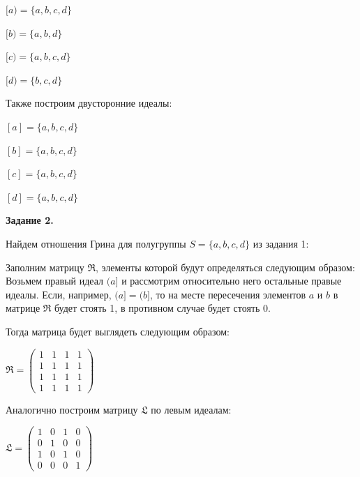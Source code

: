\documentclass[bachelor, och, labwork]{shiza}
\begin{document}
\begin{enumerate}
      \begin{center}
      
        $[a) = \{a, b, c, d\}$

        $[b) = \{a, b, d\}$

        $[c) = \{a, b, c, d\}$

        $[d) = \{b, c, d\}$
      \end{center}

      Также построим двусторонние идеалы:

      \begin{center}
      
        $[a] = \{a, b, c, d\}$

        $[b] = \{a, b, c, d\}$

        $[c] = \{a, b, c, d\}$

        $[d] = \{a, b, c, d\}$
        
      \end{center}


    \end{enumerate}
    
    
    \textbf{Задание 2.}
    
    Найдем отношения Грина для полугруппы $S = \{a, b, c, d\}$ из задания 1:

    Заполним матрицу $\mathfrak{R}$, элементы которой будут определяться следующим образом: Возьмем правый идеал $(a]$ и рассмотрим относительно
    него остальные правые идеалы. Если, например, $(a] = (b]$, то на месте пересечения элементов $a$ и $b$ в матрице $\mathfrak{R}$ будет стоять 1,
    в противном случае будет стоять 0.

    Тогда матрица будет выглядеть следующим образом:

    \begin{center}
      $\mathfrak{R} =
      \begin{pmatrix}
        1 & 1 & 1 & 1 \\
        1 & 1 & 1 & 1 \\
        1 & 1 & 1 & 1 \\
        1 & 1 & 1 & 1
      \end{pmatrix}$
    \end{center}
    
    Аналогично построим матрицу $\mathfrak{L}$ по левым идеалам:

    \begin{center}
      $\mathfrak{L} =
      \begin{pmatrix}
          1 & 0 & 1 & 0 \\
          0 & 1 & 0 & 0 \\
          1 & 0 & 1 & 0 \\
          0 & 0 & 0 & 1
        \end{pmatrix}$
    \end{center}
    
\end{document}
